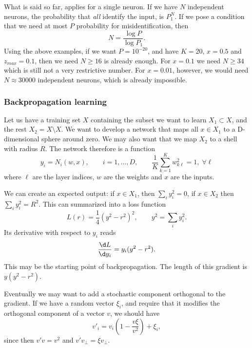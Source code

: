 \documentclass[10pt,a4paper]{article}
\begin{document}
What is said so far, applies for a single neuron. If we have $N$ independent neurons, the probability that \emph{all} identify the input, is $P_1^N$. If we pose a condition that we need at most $P$ probability for misidentification, then
\begin{equation}
  N=\frac{\log P}{\log P_1}.
\end{equation}
Using the above examples, if we want $P=10^{-20}$, and have $K=20,\,x=0.5$ and $z_{max}=0.1$, then we need $N\ge16$ is already enough. For $x=0.1$ we need $N\ge34$ which is still not a very restrictive number. For $x=0.01$, however, we would need $N\approx 30000$ independent neurons, which is already impossible.

\subsubsection{Backpropagation learning}

Let us have a training set $X$ containing the subset we want to learn $X_1\subset X$, and the rest $X_2 = X\setminus X$. We want to develop a network that maps all $x\in X_1$ to a D-dimensional sphere around zero. We may also want that we map $X_2$ to a shell with radius $R$. The network therefore is a function
\begin{equation}
  y_i = N_i(w,x),\qquad i=1,\dots,D,\qquad \frac1K\sum_{k=1}^K w_{k\ell}^2 = 1,\;\forall \ell
\end{equation}
where $\ell$ are the layer indices, $w$ are the weights and $x$ are the inputs.

We can create an expected output: if $x\in X_1$, then $\sum_i y_i^2=0$, if $x\in X_2$ then $\sum_i y_i^2=R^2$. This can summarized into a loss function
\begin{equation}
  L(r) = \frac14 (y^2 - r^2)^2,\qquad y^2 = \sum_i y_i^2.
\end{equation}
Its derivative with respect to $y_i$ reads
\begin{equation}
   \frac{\d L}{\d y_i} = y_i (y^2 - r^2).
\end{equation}
This may be the starting point of backpropagation. The length of this gradient is $y(y^2-r^2)$.

Eventually we may want to add a stochastic component orthogonal to the gradient. If we have a random vector $\xi_i$, and require that it modifies the orthogonal component of a vector $v$, we should have
\begin{equation}
  v'_i = v_i\left(1- \frac{v\xi}{v^2}\right) + \xi_i,
\end{equation}
since then $v'v=v^2$ and $v'v_\perp = \xi v_\perp$.
\end{document}
